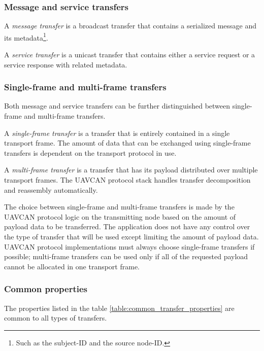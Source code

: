 \subsubsection{Message and service transfers}

A \emph{message transfer} is a broadcast transfer that contains a serialized message and its
metadata\footnote{Such as the subject-ID and the source node-ID.}.

A \emph{service transfer} is a unicast transfer that contains either a service request or a service response
with related metadata.

\subsubsection{Single-frame and multi-frame transfers}

Both message and service transfers can be further distinguished between single-frame and multi-frame transfers.

A \emph{single-frame transfer} is a transfer that is entirely contained in a single transport frame.
The amount of data that can be exchanged using single-frame transfers is dependent on the transport protocol in use.

A \emph{multi-frame transfer} is a transfer that has its payload distributed over multiple transport frames.
The UAVCAN protocol stack handles transfer decomposition and reassembly automatically.

The choice between single-frame and multi-frame transfers is made by the UAVCAN protocol logic on
the transmitting node based on the amount of payload data to be transferred.
The application does not have any control over the type of transfer that will be used
except limiting the amount of payload data.
UAVCAN protocol implementations must always choose single-frame transfers if possible;
multi-frame transfers can be used only if all of the requested payload cannot be allocated in one transport frame.

\subsubsection{Common properties}

The properties listed in the table \ref{table:common_transfer_properties} are common to all types of transfers.

